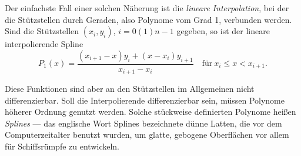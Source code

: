 Der einfachste Fall einer solchen Näherung ist die \emph{lineare
  Interpolation}, bei der die
Stützstellen durch Geraden, also Polynome vom Grad 1, verbunden
werden. Sind die Stützstellen $(x_i, y_i)$, $i=0(1)n-1$ gegeben, so ist
der lineare interpolierende Spline
\begin{equation}
  P_1(x) = \frac{(x_{i+1} - x)y_i + (x - x_i)y_{i+1}}
  {x_{i+1}-x_i}
  \quad\text{für}~ x_i \le x < x_{i+1}.
\end{equation}

Diese Funktionen sind aber an den Stützstellen im Allgemeinen nicht
differenzierbar. Soll die Interpolierende differenzierbar sein, müssen
Polynome höherer Ordnung genutzt werden. Solche stückweise definierten
Polynome heißen \emph{Splines} --- das englische Wort Splines
bezeichnete dünne Latten, die vor dem Computerzeitalter benutzt
wurden, um glatte, gebogene Oberflächen vor allem für Schiffsrümpfe zu
entwickeln.

